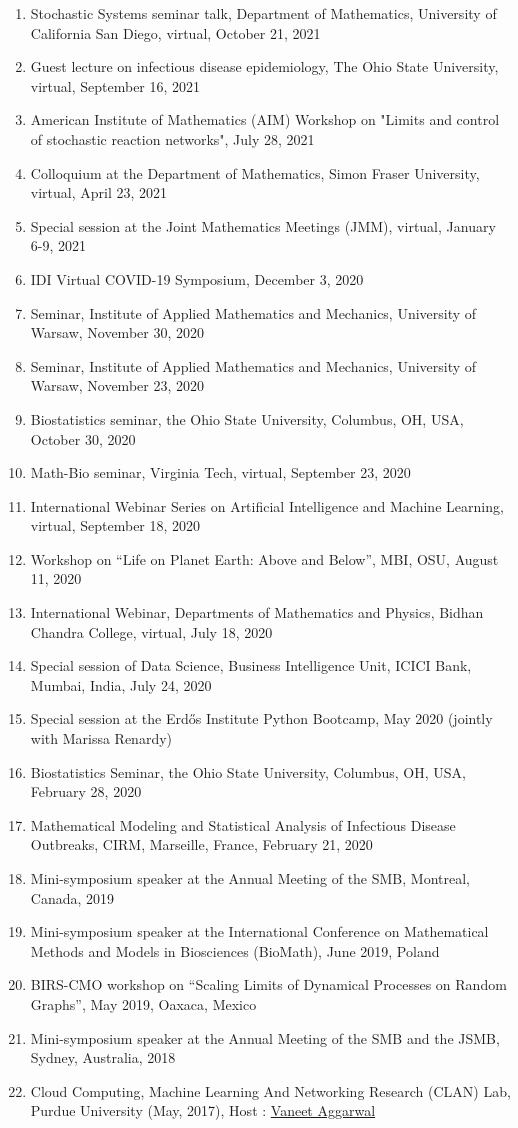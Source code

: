 \documentclass[11pt,a4paper,sans]{moderncv}        %
\begin{document}
\begin{enumerate}
	\item Stochastic Systems seminar talk, Department of Mathematics, University of California San Diego, virtual, October 21, 2021
	\item Guest lecture on infectious disease epidemiology, The Ohio State University, virtual, September 16, 2021
	\item American Institute of Mathematics (AIM) Workshop on "Limits and control of stochastic reaction networks", July 28, 2021
	\item Colloquium at the Department of Mathematics, Simon Fraser University, virtual, April 23, 2021
	\item Special session at the Joint Mathematics Meetings (JMM), virtual, January 6-9, 2021
	\item IDI Virtual COVID-19 Symposium, December 3, 2020
	\item Seminar, Institute of Applied Mathematics and Mechanics, University of Warsaw, November 30, 2020
	\item Seminar, Institute of Applied Mathematics and Mechanics, University of Warsaw, November 23, 2020
	\item Biostatistics seminar, the Ohio State University, Columbus, OH, USA, October 30, 2020
	\item Math-Bio seminar, Virginia Tech, virtual, September 23, 2020
	\item International Webinar Series on Artificial Intelligence and Machine Learning, virtual, September 18, 2020 
	\item {Workshop on “Life on Planet Earth: Above and Below”, MBI, OSU, August 11, 2020}
	\item {International Webinar, Departments of Mathematics and Physics, Bidhan Chandra College, virtual, July 18, 2020}
	\item {Special session of Data Science, Business Intelligence Unit, ICICI Bank, Mumbai, India, July 24, 2020}
	\item {Special session at the Erd\H{o}s Institute Python Bootcamp, May 2020 (jointly with Marissa Renardy)}
	\item {Biostatistics Seminar, the Ohio State University, Columbus, OH, USA, February 28, 2020}
	\item {Mathematical Modeling and Statistical Analysis of Infectious Disease Outbreaks, CIRM, Marseille, France, February 21, 2020}
	\item {Mini-symposium speaker at the Annual Meeting of the SMB, Montreal, Canada, 2019}
	\item {Mini-symposium speaker at the International Conference on Mathematical Methods and Models in Biosciences (BioMath), June 2019, Poland}
	\item {BIRS-CMO workshop on ``Scaling Limits of Dynamical Processes on Random Graphs'', May 2019, Oaxaca, Mexico}
	\item {Mini-symposium speaker at the Annual Meeting of the SMB and the JSMB, Sydney, Australia, 2018}
	\item {Cloud Computing, Machine Learning And Networking Research (CLAN) Lab, Purdue University (May, 2017), Host : \href{http://web.ics.purdue.edu/~vaneet/}{Vaneet Aggarwal} }
\end{enumerate}
\end{document}

